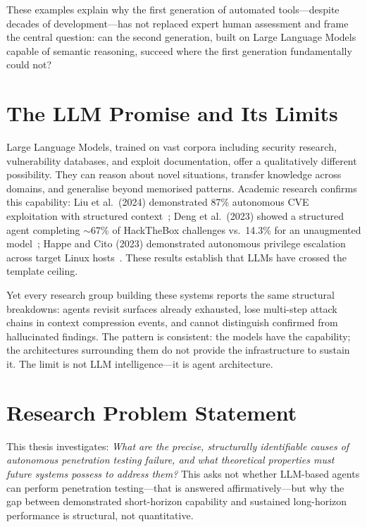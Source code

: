 \documentclass[12pt,a4paper,oneside,openany]{book}
\begin{document}
These examples explain why the first generation of automated tools---despite decades of development---has not replaced expert human assessment and frame the central question: can the second generation, built on Large Language Models capable of semantic reasoning, succeed where the first generation fundamentally could not?

\section{The LLM Promise and Its Limits}

Large Language Models, trained on vast corpora including security research, vulnerability databases, and exploit documentation, offer a qualitatively different possibility. They can reason about novel situations, transfer knowledge across domains, and generalise beyond memorised patterns. Academic research confirms this capability: Liu et al.\ (2024) demonstrated 87\% autonomous CVE exploitation with structured context~\citep{liu2024gpts}; Deng et al.\ (2023) showed a structured agent completing $\sim$67\% of HackTheBox challenges vs.\ 14.3\% for an unaugmented model~\citep{deng2024pentestgpt}; Happe and Cito (2023) demonstrated autonomous privilege escalation across target Linux hosts~\citep{happe2023hackerllm}. These results establish that LLMs have crossed the template ceiling.

Yet every research group building these systems reports the same structural breakdowns: agents revisit surfaces already exhausted, lose multi-step attack chains in context compression events, and cannot distinguish confirmed from hallucinated findings. The pattern is consistent: the models have the capability; the architectures surrounding them do not provide the infrastructure to sustain it. The limit is not LLM intelligence---it is agent architecture.


\section{Research Problem Statement}

This thesis investigates: \textit{What are the precise, structurally identifiable causes of autonomous penetration testing failure, and what theoretical properties must future systems possess to address them?} This asks not whether LLM-based agents can perform penetration testing---that is answered affirmatively---but why the gap between demonstrated short-horizon capability and sustained long-horizon performance is structural, not quantitative.
\end{document}
